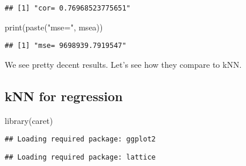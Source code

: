 \documentclass[
]{article}
\newenvironment{Shaded}{\begin{snugshade}}{\end{snugshade}}
\newcommand{\AttributeTok}[1]{\textcolor[rgb]{0.77,0.63,0.00}{#1}}
\newcommand{\CommentTok}[1]{\textcolor[rgb]{0.56,0.35,0.01}{\textit{#1}}}
\newcommand{\DecValTok}[1]{\textcolor[rgb]{0.00,0.00,0.81}{#1}}
\newcommand{\FunctionTok}[1]{\textcolor[rgb]{0.00,0.00,0.00}{#1}}
\newcommand{\NormalTok}[1]{#1}
\newcommand{\OtherTok}[1]{\textcolor[rgb]{0.56,0.35,0.01}{#1}}
\newcommand{\SpecialCharTok}[1]{\textcolor[rgb]{0.00,0.00,0.00}{#1}}
\newcommand{\StringTok}[1]{\textcolor[rgb]{0.31,0.60,0.02}{#1}}
\begin{document}
\begin{verbatim}
## [1] "cor= 0.76968523775651"
\end{verbatim}

\begin{Shaded}
\begin{Highlighting}[]
\FunctionTok{print}\NormalTok{(}\FunctionTok{paste}\NormalTok{(}\StringTok{"mse="}\NormalTok{, msea))}
\end{Highlighting}
\end{Shaded}

\begin{verbatim}
## [1] "mse= 9698939.7919547"
\end{verbatim}

We see pretty decent results. Let's see how they compare to kNN.

\hypertarget{knn-for-regression}{%
\subsection{kNN for regression}\label{knn-for-regression}}

\begin{Shaded}
\begin{Highlighting}[]
\FunctionTok{library}\NormalTok{(caret)}
\end{Highlighting}
\end{Shaded}

\begin{verbatim}
## Loading required package: ggplot2
\end{verbatim}

\begin{verbatim}
## Loading required package: lattice
\end{verbatim}

\begin{Shaded}
\end{Shaded}
\end{document}
